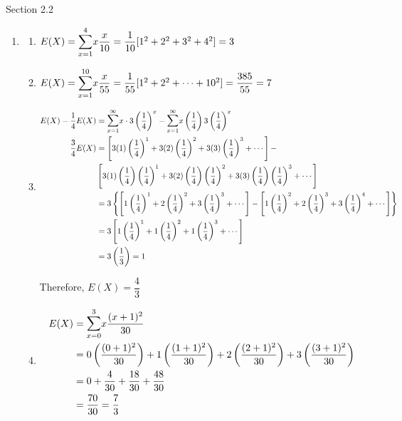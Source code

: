 \documentclass{article}
\begin{document}
    Section 2.2
    \begin{enumerate}
     \item 
      \begin{enumerate}
       \item 
	  $E(X) = \mathlarger{\sum}_{x=1}^4{x\dfrac{x}{10}} = \dfrac{1}{10}[1^2+2^2+3^2+4^2] = 3$
       \item 
	  $E(X) = \mathlarger{\sum}_{x=1}^{10}{x\dfrac{x}{55}} = \dfrac{1}{55}[1^2+2^2+\cdots+10^2]
	    = \dfrac{385}{55} = 7$
       
       \item
	  \begin{align*}
	    E(X) - \dfrac{1}{4}E(X) 
	      &= \mathlarger{\sum}_{x=1}^\infty{x\cdot3\left(\dfrac{1}{4}\right)^x} 
	      - \mathlarger{\sum}_{x=1}^\infty{x\left(\dfrac{1}{4}\right)3\left(\dfrac{1}{4}\right)^x} \\
	    \dfrac{3}{4}E(X) &= \left[3(1)\left(\dfrac{1}{4}\right)^1 + 3(2)\left(\dfrac{1}{4}\right)^2
		+ 3(3)\left(\dfrac{1}{4}\right)^3 + \cdots \right] - \\
		& \left[ 3(1)\left(\dfrac{1}{4}\right)\left(\dfrac{1}{4}\right)^1 +
		3(2)\left(\dfrac{1}{4}\right)\left(\dfrac{1}{4}\right)^2 +
		3(3)\left(\dfrac{1}{4}\right)\left(\dfrac{1}{4}\right)^3 + \cdots \right] \\
	    &= 3 \left\{ \left[ 1\left(\dfrac{1}{4}\right)^1 + 2\left(\dfrac{1}{4}\right)^2
		+ 3\left(\dfrac{1}{4}\right)^3 + \cdots \right] -
		\left[ 1\left(\dfrac{1}{4}\right)^2
		+ 2\left(\dfrac{1}{4}\right)^3 + 3\left(\dfrac{1}{4}\right)^4 + \cdots \right] \right\} \\
	    &= 3 \left[ 1 \left(\dfrac{1}{4}\right)^1 + 1 \left(\dfrac{1}{4}\right)^2
		+ 1 \left(\dfrac{1}{4}\right)^3 + \cdots \right] \\
	    &= 3 \left( \dfrac{1}{3} \right) = 1
	  \end{align*}
	  
	  Therefore, $E(X) = \dfrac{4}{3}$
	  
       \item
	  \begin{align*}
	   E(X) &= \mathlarger{\sum}_{x=0}^3{x\dfrac{(x+1)^2}{30}} \\
	      &= 0\left(\dfrac{(0+1)^2}{30}\right) + 1\left(\dfrac{(1+1)^2}{30}\right) 
		+ 2\left(\dfrac{(2+1)^2}{30}\right) + 3\left(\dfrac{(3+1)^2}{30}\right) \\
	      &= 0 + \dfrac{4}{30} + \dfrac{18}{30} + \dfrac{48}{30} \\
	      &= \dfrac{70}{30} = \dfrac{7}{3}
	  \end{align*}
	  

\end{enumerate}
\end{enumerate}
\end{document}
